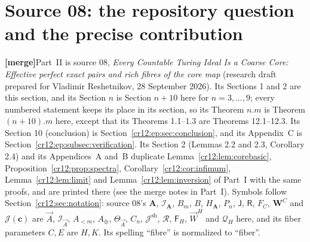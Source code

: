 \documentclass[11pt,letterpaper]{article}
\theoremstyle{plain}
\theoremstyle{definition}
\theoremstyle{remark}
\numberwithin{equation}{section}
\newcommand{\Rcode}{\mathcal R}
\newcommand{\I}{\mathcal I}
\newcommand{\mergenote}[1]{\par\smallskip\noindent
 {\small\textsf{\textbf{[merge]}}\enspace #1}\par\smallskip}
\newcommand{\Aplus}{A_{\oplus}}          %
\newcommand{\Alt}[1]{A_{<#1}}            %
\newcommand{\Jsh}{\mathcal J^{\mathrm{sh}}} %
\newcommand{\Fint}{\mathsf F}            %
\newcommand{\WW}{\vec W}                 %
\begin{document}
\section{Source 08: the repository question and the precise contribution}\label{cr12:ep:sec:scope}
\mergenote{Part~II is source 08, \emph{Every Countable Turing Ideal Is a Coarse
Core: Effective perfect exact pairs and rich fibres of the core map} (research
draft prepared for Vladimir Reshetnikov, 28 September 2026). Its Sections 1 and 2
are this section, and its Section $n$ is Section $n+10$ here for $n=3,\dots,9$;
every numbered statement keeps its place in its section, so its Theorem $n.m$ is
Theorem $(n+10).m$ here, except that its Theorems 1.1--1.3 are Theorems
12.1--12.3. Its Section 10 (conclusion) is Section~\ref{cr12:ep:sec:conclusion}, and
its Appendix~C is Section~\ref{cr12:ep:subsec:verification}. Its Section 2
(Lemmas 2.2 and 2.3, Corollary 2.4) and its Appendices~A and~B duplicate
Lemma~\ref{cr12:lem:corebasic}, Proposition~\ref{cr12:prop:spectra},
Corollary~\ref{cr12:cor:infimum}, Lemma~\ref{cr12:lem:limit} and
Lemma~\ref{cr12:lem:inversion} of Part~I with the same proofs, and are printed there
(see the merge notes in Part~I). Symbols follow Section~\ref{cr12:sec:notation}:
source 08's $\boldsymbol A$, $\mathcal I_{\boldsymbol A}$, $B_m$, $B$, $H_{\boldsymbol A}$,
$P_n$, $\mathsf J$, $\mathsf R$, $F_C$, $\boldsymbol W^C$ and $\mathcal J(\mathbf c)$ are
$\vec A$, $\I_{\vec A}$, $\Alt m$, $\Aplus$, $\Theta_{\vec A}$, $C_n$, $\Jsh$, $\Rcode$,
$\Fint_H$, $\WW^H$ and $\mathcal Q_H$ here, and its fiber parameters $C,E$ are
$H,K$. Its spelling ``fibre'' is normalized to ``fiber''.}
\end{document}
